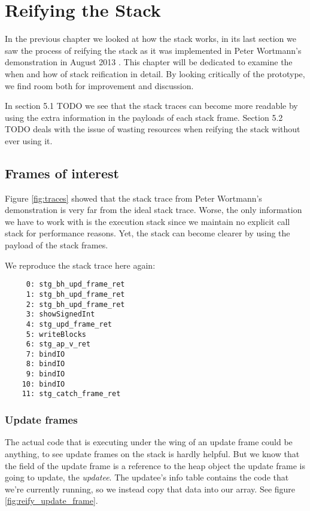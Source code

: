 \chapter{Reifying the Stack}

In the previous chapter we looked at how the stack works, in its
last section we saw the process of reifying the stack as it was
implemented in Peter Wortmann's demonstration in August 2013
\cite{stack_traces_ticket}. This chapter will be dedicated to examine
the when and how of stack reification in detail. By looking critically
of the prototype, we find room both for improvement and discussion.

In section 5.1 TODO we see that the stack traces can become more
readable by using the extra information in the payloads of each stack
frame. Section 5.2 TODO deals with the issue of wasting
resources when reifying the stack without ever using it.

\section{Frames of interest}

Figure \ref{fig:traces} showed that the stack trace from Peter Wortmann's
demonstration is very far from the ideal stack trace.  Worse, the only
information we have to work with is the execution stack since we maintain no
explicit call stack for performance reasons. Yet, the stack can become
clearer by using the payload of the stack frames.

We reproduce the stack trace here again:

\begin{verbatim}
     0: stg_bh_upd_frame_ret
     1: stg_bh_upd_frame_ret
     2: stg_bh_upd_frame_ret
     3: showSignedInt
     4: stg_upd_frame_ret
     5: writeBlocks
     6: stg_ap_v_ret
     7: bindIO
     8: bindIO
     9: bindIO
    10: bindIO
    11: stg_catch_frame_ret
\end{verbatim}


\subsection{Update frames}

The actual code that is executing under the wing of an update frame
could be anything, to see update frames on the stack is hardly helpful.
But we know that the field of the update frame is a reference to the
heap object the update frame is going to update, the \emph{updatee}. The updatee's
info table contains the code that we're currently running, so we instead
copy that data into our array. See figure \ref{fig:reify_update_frame}.

